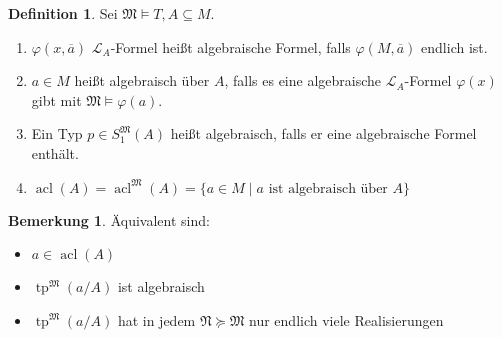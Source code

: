 \documentclass[12pt,parskip=full]{scrartcl}
\theoremstyle{definition}
\newtheorem{definition}[theorem]{Definition}
\newtheorem{remark}[theorem]{Bemerkung}
\begin{document}
 	\begin{definition}
 		Sei $\mathfrak{M} \models T, A \subseteq M$.
 		\begin{enumerate}
 			\item $\varphi(x, \overline{a})$ $\mathcal{L}_A$-Formel heißt algebraische Formel, falls $\varphi(M, \overline{a})$ endlich ist.
 			\item $a \in M$ heißt algebraisch über $A$, falls es eine algebraische $\mathcal{L}_A$-Formel $\varphi(x)$ gibt mit $\mathfrak{M} \models \varphi(a)$.
 			\item Ein Typ $p \in S_1^\mathfrak{M}(A)$ heißt algebraisch, falls er eine algebraische Formel enthält.
 			\item $\operatorname{acl}(A) = \operatorname{acl}^\mathfrak{M}(A) = \{ a \in M \mid a \text{ ist algebraisch über $A$} \}$
 		\end{enumerate}
 	\end{definition}
 
 	\begin{remark}
 		Äquivalent sind:
 		\begin{itemize}
 			\item $a \in \operatorname{acl}(A)$
 			\item $\operatorname{tp}^\mathfrak{M}(a/A)$ ist algebraisch
 			\item $\operatorname{tp}^\mathfrak{M}(a/A)$ hat in jedem $\mathfrak{N} \succcurlyeq \mathfrak{M}$ nur endlich viele Realisierungen
 		\end{itemize}
 	\end{remark}
\end{document}

